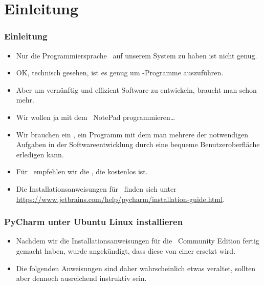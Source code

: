 \documentclass[aspectratio=169,mathserif,notheorems]{beamer}%
\subtitle{4.~PyCharm Installieren}%
\begin{document}
%
%
\startPresentation%
%
\section{Einleitung}%
%
\begin{frame}[t]%
\frametitle{Einleitung}%
\begin{itemize}%
\item Nur die Programmiersprache \python\ auf unserem System zu haben ist nicht genug.%
\item<2-> OK, technisch gesehen, ist es genug um \python-Programme auszuführen.%
\item<3-> Aber um vernünftig und effizient Software zu entwickeln, braucht man schon mehr.%
\item<4-> Wir wollen ja mit dem \microsoftWindows\ NotePad programmieren\dots%
\item<6-> Wir brauchen ein , ein Programm mit dem man mehrere der notwendigen Aufgaben in der Softwareentwicklung durch eine bequeme Benutzeroberfläche erledigen kann.%
\item<7-> Für \python\ empfehlen wir die \pycharm{} , die kostenlos ist.%
\item<8-> Die Installationsanweisungen für \pycharm\ finden sich unter \url{https://www.jetbrains.com/help/pycharm/installation-guide.html}.%
\end{itemize}%
%
%
\end{frame}%
%

\begin{frame}[t]%
\frametitle{PyCharm unter Ubuntu Linux installieren}%
\begin{itemize}%
\item Nachdem wir die Installationsanweisungen für die \pycharm\ Community Edition fertig gemacht haben, wurde angekündigt, dass diese von einer  ersetzt wird.%
\item<2-> Die folgenden Anweisungen sind daher wahrscheinlich etwas veraltet, sollten aber dennoch ausreichend instruktiv sein.%
\end{itemize}%
%
\end{frame}%
%
\end{document}
